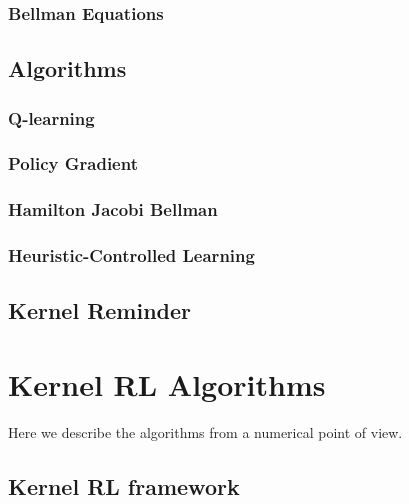 \documentclass[
]{article}
\numberwithin{equation}{section}
\begin{document}
\hypertarget{Bellman Equations}{%
\subsubsection{Bellman Equations}\label{Bellman Equations}}


\hypertarget{Algorithms}{%
\subsection{Algorithms}\label{Algorithms}}

\hypertarget{Q-learning}{%
\subsubsection{Q-learning}\label{Q-learning}}

\hypertarget{Policy Gradient}{%
\subsubsection{Policy Gradient}\label{Policy Gradient}}

\subsubsection{Hamilton Jacobi Bellman}\label{HJB}

\hypertarget{Heuristic-Controlled Learning}{%
\subsubsection{Heuristic-Controlled Learning}\label{Heuristic-Controlled Learning}}

\hypertarget{Kernel Reminder}{%
\subsection{Kernel Reminder}\label{Kernel Reminder}}

\hypertarget{Kernel RL Algorithms}{%
\section{Kernel RL Algorithms}\label{Kernel RL Algorithms}}

Here we describe the algorithms from a numerical point of view. 

\hypertarget{Kernel RL framework}{%
\subsection{Kernel RL framework}\label{Kernel RL framework}}
\end{document}
